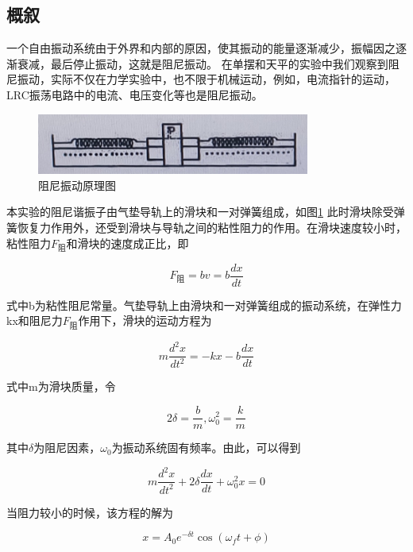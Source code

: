 \documentclass{ctexart}
\begin{document}
  \subsection{概叙}
  一个自由振动系统由于外界和内部的原因，使其振动的能量逐渐减少，振幅因之逐渐衰减，最后停止振动，这就是阻尼振动。
  在单摆和天平的实验中我们观察到阻尼振动，实际不仅在力学实验中，也不限于机械运动，例如，电流指针的运动，LRC振荡电路中的电流、电压变化等也是阻尼振动。

  \begin{figure}[H]\label{yuanlitu}
    \centering
    \includegraphics[width=0.8\textwidth,height=0.1\textheight]{yuanlitu.jpg}
    \caption{阻尼振动原理图}
  \end{figure}

  本实验的阻尼谐振子由气垫导轨上的滑块和一对弹簧组成，如图\ref{yuanlitu}
  此时滑块除受弹簧恢复力作用外，还受到滑块与导轨之间的粘性阻力的作用。在滑块速度较小时，粘性阻力$F_{\mbox{阻}}$和滑块的速度成正比，即

  \begin{equation}
    F_{\mbox{阻}} = bv =b \frac{dx}{dt}
  \end{equation}


  式中b为粘性阻尼常量。气垫导轨上由滑块和一对弹簧组成的振动系统，在弹性力kx和阻尼力$F_{\mbox{阻}}$作用下，滑块的运动方程为

  \begin{equation}
    m \frac{d^{2}x}{dt^{2}} = -kx - b\frac{dx}{dt}
  \end{equation}

  式中m为滑块质量，令

  $$2\delta = \frac{b}{m}, \omega^{2}_{0} = \frac{k}{m}$$

  其中$\delta$为阻尼因素，$\omega_{0}$为振动系统固有频率。由此，可以得到

  \begin{equation}
    m \frac{d^{2}x}{dt^{2}} + 2\delta \frac{dx}{dt} + \omega^{2}_{0} x = 0
  \end{equation}

  当阻力较小的时候，该方程的解为

  \begin{equation}
    x = A_{0} e^{-\delta t} \cos (\omega_{f} t + \phi)
  \end{equation}
\end{document}
